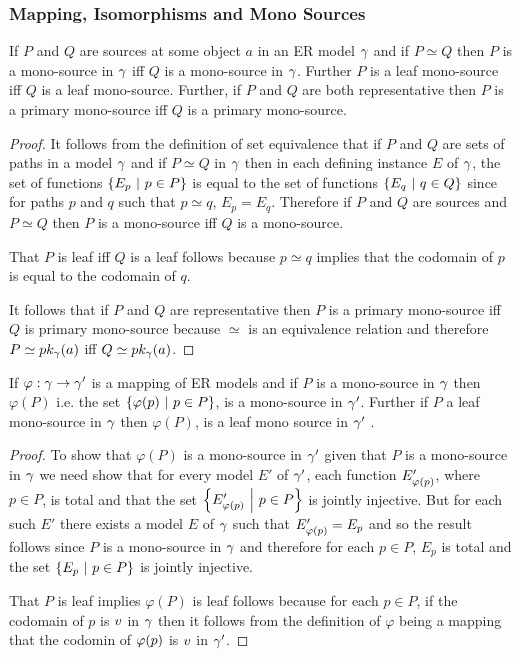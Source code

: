 \subsubsection{Mapping, Isomorphisms and Mono Sources}

\begin{lemma}
If  $P$ and $Q$ are sources at some object $a$ in an ER model $\gamma$ and if $P \simeq Q$  then   $P$ is a mono-source in $\gamma$ iff $Q$ is a mono-source in $\gamma$.  Further $P$ is a leaf mono-source iff $Q$ is a leaf mono-source. Further, if $P$ and $Q$ are both representative then $P$ is a primary mono-source iff $Q$ is a primary mono-source.
\end{lemma}
\begin{proof}
It follows from the definition of set equivalence that if $P$ and $Q$ are sets of paths in a model $\gamma$ and if $P \simeq Q$ in $\gamma$ then in each defining instance $E$ of $\gamma$, the set of functions $\left\{E_p \ \middle|\ p \in P\right\}$ is equal to the set of functions $\left\{E_q \ \middle|\ q \in Q\right\}$ since for
paths $p$ and $q$ such that $p \simeq q$, $E_p=E_q$. Therefore if $P$ and $Q$ are sources and $P \simeq Q$ then $P$ is a mono-source iff $Q$ is a mono-source.


That $P$ is leaf  iff $Q$ is a leaf 
follows because $p \simeq q$ implies that the codomain of $p$ is equal to the codomain of $q$.

It follows that if $P$ and $Q$ are representative then $P$ is a primary mono-source iff $Q$ is  primary mono-source  because  $\simeq$ is an equivalence relation and therefore $P \simeq pk_{\gamma}(a)$ iff $Q \simeq pk_{\gamma}(a)$.
\end{proof}

\begin{lemma}
If $\varphi: \gamma \rightarrow \gamma'$ is a mapping of ER models and
if $P$ is a mono-source in $\gamma$ then  
$\varphi(P)$ i.e. the set $\left\{\varphi(p) \ \middle|\ p\in P\right\}$, is a mono-source in $\gamma'$. 
Further if $P$ a leaf mono-source in $\gamma$ then $\varphi(P)$,  is a leaf mono source in $\gamma'$ .
\end{lemma}
\begin{proof}
To show that $\varphi(P)$ is a mono-source in $\gamma'$ given that $P$ is a mono-source in $\gamma$ we need show that for every model $E'$ of $\gamma'$, 
each function $E'_{\varphi(p)}$,  where $p \in P$, is total and that the set
$\left\{E'_{\varphi(p)} \ \middle|\ p \in P\right\}$ is jointly injective. But for each such $E'$ there exists a model $E$ of $\gamma$ such that $E'_{\varphi(p)}=E_{p}$  and so the result follows  since $P$ is a mono-source in $\gamma$ and therefore for each $p \in P$, $E_p$ is total and the set $\left\{E_p \ \middle|\ p\in P\right\}$ is jointly injective.

That $P$ is leaf implies $\varphi(P)$ is leaf follows because for each $p \in P$, if the codomain of $p$ is 
$v$ in $\gamma$ then it follows from the definition of $\varphi$ being a mapping that the codomin of $\varphi(p)$ is  $v$ in $\gamma'$. 
\end{proof}

